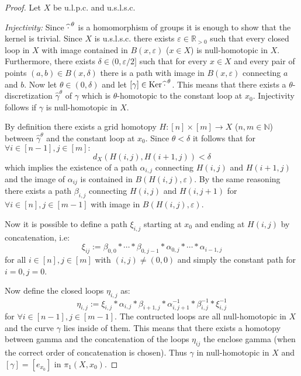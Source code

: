 \documentclass[a4paper, 11pt, twoside]{article}
\newcommand{\R}[0]{\mathbb{R}}
\newcommand{\N}[0]{\mathbb{N}}
\theoremstyle{break}
\theoremstyle{break}
\begin{document}
\begin{proof}
  Let $X$ be u.l.p.c. and u.s.l.s.c.

  \textit{Injectivity:} Since $\widehat{\cdot}^{\hspace*{2px}\theta}$ is a homomorphism of groups it is enough to show that the kernel is trivial.
  Since $X$ is u.s.l.s.c. there exists $\varepsilon \in \R_{>0}$ 
  such that every closed loop in $X$ with image contained in $B(x, \varepsilon)$ ($x\in X$) is null-homotopic in $X$. Furthermore,
  there exists $\delta \in (0, \varepsilon/2]$ such that for every $x \in X$ and every pair of points $(a,b) \in B(x, \delta)$ there is a path with image in $B(x, \varepsilon)$ connecting $a$ and $b$.
  Now let $\theta \in (0, \delta)$ and let $[\gamma] \in {\rm Ker} \hspace*{2px} \widehat{\cdot}^{\hspace*{2px}\theta}$. 
  This means that there exists a $\theta$-discretization $\widehat{\gamma}^{\theta}$ of $\gamma$ which is $\theta$-homotopic to the constant loop at $x_0$.
  Injectivity follows if $\gamma$ is null-homotopic in $X$.
  
  By definition there exists a grid homotopy $H: [n] \times [m] \to X$ ($n,m\in\N$) between $\widehat{\gamma}^{\theta}$ and the constant loop at $x_0$.
  Since $\theta < \delta$ it follows that for $\forall i \in [n-1], j \in [m]:$ 
  \begin{equation*}
    d_X(H(i,j), H(i+1,j)) < \delta
  \end{equation*} which implies the existence of a path $\alpha_{i,j}$ connecting $H(i,j)$ and $H(i+1,j)$ and
  the image of $\alpha_{ij}$ is contained in $B(H(i,j), \varepsilon)$.
  By the same reasoning there exists a path $\beta_{i,j}$ connecting $H(i,j)$ and $H(i,j+1)$ for $\forall i \in [n], j \in [m-1]$ with image in $B(H(i,j), \varepsilon)$.

  Now it is possible to define a path $\xi_{i,j}$ starting at $x_0$ and ending at $H(i,j)$ by concatenation, i.e:
  \begin{equation*}
    \xi_{ij} := \beta_{0,0} * \cdots * \beta_{0,j-1} * \alpha_{0,j} * \cdots * \alpha_{i-1,j}
  \end{equation*}
  for all $i \in [n], j \in [m]$ with $(i,j) \neq (0,0)$ and simply the constant path for $i = 0, j = 0$. 
  
  Now define the closed loops $\eta_{i,j}$ as:
  \begin{equation*}
    \eta_{i,j} := \xi_{i,j} * \alpha_{i,j} * \beta_{i+1,j} * \alpha^{-1}_{i,j+1} * \beta^{-1}_{i,j} * \xi^{-1}_{i,j}
  \end{equation*}
  for $\forall i \in [n-1], j \in [m-1]$.
  The contructed loops are all null-homotopic in $X$ and the curve $\gamma$ lies inside of them. 
  This means that there exists a homotopy between gamma and the concatenation of the loops $\eta_{ij}$ the enclose gamma (when the correct order of concatenation is chosen).
  Thus $\gamma$ in null-homotopic in $X$ and $[\gamma] = [e_{x_0}]$ in $\pi_1(X, x_0)$.


\end{proof}
\end{document}
